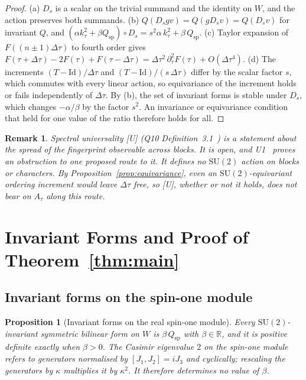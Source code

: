 \documentclass[12pt,a4paper]{article}
\newtheorem{proposition}[theorem]{Proposition}
\newtheorem{remark}[theorem]{Remark}
\newcommand{\SU}{\mathrm{SU}}
\newcommand{\Qsp}{Q_{\mathrm{sp}}}
\begin{document}
    \begin{proof}
      (a) $D_s$ is a scalar on the trivial summand and the identity on $W$, and the action preserves both summands.
      (b) $Q(D_s g v) = Q(g D_s v) = Q(D_s v)$ for invariant $Q$, and
      $(\alpha k_\tau^2 + \beta\Qsp)\circ D_s = s^2\alpha\,k_\tau^2 + \beta\,\Qsp$.
      (c) Taylor expansion of $F((n\pm1)\Delta\tau)$ to fourth order gives
      $F(\tau+\Delta\tau) - 2F(\tau) + F(\tau-\Delta\tau) = \Delta\tau^2\,\partial_\tau^2F(\tau) + O(\Delta\tau^4)$.
      (d) The increments $(T-\mathrm{Id})/\Delta\tau$ and $(T-\mathrm{Id})/(s\,\Delta\tau)$ differ by the scalar
      factor $s$, which commutes with every linear action, so equivariance of the increment holds or fails
      independently of $\Delta\tau$.
      By (b), the set of invariant forms is stable under $D_s$, which changes $-\alpha/\beta$ by the factor $s^2$.
      An invariance or equivariance condition that held for one value of the ratio therefore holds for all.
    \end{proof}

    \begin{remark}
      Spectral universality [U] (Q10 Definition~3.1~\cite{Beau2026q10}) is a statement about the spread of the
      fingerprint observable across blocks.
      It is open, and U1~\cite{Beau2026u1} proves an obstruction to one proposed route to it.
      It defines no $\SU(2)$ action on blocks or characters.
      By Proposition~\ref{prop:equivariance}, even an $\SU(2)$-equivariant ordering increment would leave
      $\Delta\tau$ free, so [U], whether or not it holds, does not bear on $A_\tau$ along this route.
    \end{remark}

  \section{Invariant Forms and Proof of Theorem~\ref{thm:main}}
    \label{sec:schur}

    \subsection{Invariant forms on the spin-one module}

      \begin{proposition}[Invariant forms on the real spin-one module]
        \label{prop:schur}
        Every $\SU(2)$-invariant symmetric bilinear form on $W$ is $\beta\,\Qsp$ with $\beta\in\mathbb{R}$, and it is
        positive definite exactly when $\beta>0$.
        The Casimir eigenvalue $2$ on the spin-one module refers to generators normalised by $[J_1,J_2] = iJ_3$ and
        cyclically; rescaling the generators by $\kappa$ multiplies it by $\kappa^2$.
        It therefore determines no value of $\beta$.
      \end{proposition}
\end{document}
